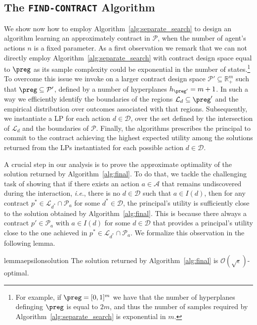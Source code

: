 \subsection{The \texttt{FIND-CONTRACT} Algorithm}\label{sec:find_contract_algo}
We show now how to employ Algorithm~\ref{alg:separate_search} to design an algorithm learning an approximately contract in $\mathcal{P}$, when the number of agent's actions $n$ is a fixed parameter. As a first observation we remark that we can not directly employ Algorithm~\ref{alg:separate_search} with contract design space equal to $\preg$ as its sample complexity could be exponential in the number of states.\footnote{For example, if $\preg=[0,1]^m$ we have that the number of hyperplanes definging $\preg$ is equal to $2m$, and thus the number of samples required by Algorithm~\ref{alg:separate_search} is exponential in $m$.} To overcome this issue we invoke \separate on a larger contract design space $\mathcal{P}' \subseteq \mathbb{R}^m_{+}$ such that $ \preg \subseteq \mathcal{P}'$, defined by a number of hyperplanes $h_{\preg'}=m+1$. In such a way we efficiently identify the boundaries of the regions $\mathcal{L}_{d} \subseteq \preg'$ and the empirical distribution over outcomes associated with that regions. Subsequently, we instantiate a LP for each action $d \in \mathcal{D}$, over the set defined by the intersection of $\mathcal{L}_{d}$ and the boundaries of $\mathcal{P}$. Finally, the algorithms prescribes the principal to commit to the contract achieving the highest expected utility among the solutions returned from the LPs instantiated for each possible action $d \in \mathcal{D}$.


A crucial step in our analysis is to prove the approximate optimality of the solution returned by Algorithm~\ref{alg:final}. To do that, we tackle the challenging task of showing that if there exists an action $a \in \mathcal{A}$ that remains undiscovered during the interaction, \emph{i.e}., there is no $d \in \mathcal{D}$ such that $a \in I(d)$, then for any contract $p^* \in \mathcal{L}_{d^*} \cap \mathcal{P}_a$ for some $d^* \in \mathcal{D}$, the principal's utility is sufficiently close to the solution obtained by Algorithm~\ref{alg:final}. This is because there always a contract $p' \in \mathcal{P}_{a}$ with $a \in I(d)$ for some $d \in \mathcal{D}$ that provides a principal's utility close to the one achieved in $ p^* \in \mathcal{L}_{d^*} \cap \mathcal{P}_a$. We formalize this observation in the following lemma.

\begin{restatable}{lemma}{epsilonsolution}\label{lem:espoptsol}
The solution returned by Algorithm~\ref{alg:final} is $\mathcal{O}(\sqrt \epsilon)$-optimal.
\end{restatable}

